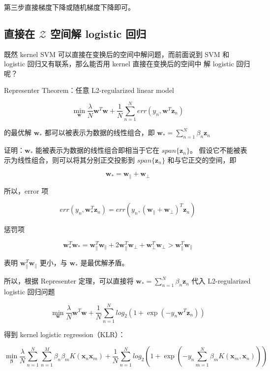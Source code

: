 \documentclass[a4paper]{article}
\begin{document}
第三步直接梯度下降或随机梯度下降即可。


\subsection{直接在 $\mathcal{Z}$ 空间解 logistic 回归}
既然 kernel SVM 可以直接在变换后的空间中解问题，而前面说到
SVM 和 logistic 回归又有联系，那么能否用 kernel 直接在变换后的空间中
解 logistic 回归呢？

Representer Theorem：任意 L2-regularized linear model

$$\operatorname*{min}_{\mathbf{w}} \frac{\lambda}{N}\mathbf{w}^T\mathbf{w} + \frac{1}{N}\sum_{n=1}^{N}err(y_n, \mathbf{w}^T\mathbf{z}_n)$$

的最优解 $\mathbf{w}_{*}$ 都可以被表示为数据的线性组合，即 $\displaystyle \mathbf{w}_{*} = \sum_{n=1}^{N}\beta_n\mathbf{z}_n$

证明：$\mathbf{w}_{*}$ 能被表示为数据的线性组合即相当于它在 $span\{\mathbf{z}_n\}$。
假设它不能被表示为线性组合，则可以将其分别正交投影到 $span\{\mathbf{z}_n\}$ 和与它正交的空间，即

$$\mathbf{w}_{*} = \mathbf{w}_{\parallel} + \mathbf{w}_{\perp}$$

所以，error 项

$$err(y_n, \mathbf{w}_{*}^T\mathbf{z}_n) = err(y_n, (\mathbf{w}_{\parallel} + \mathbf{w}_{\perp})^T\mathbf{z}_n)$$

惩罚项

$$\mathbf{w}_{*}^T\mathbf{w}_{*} = \mathbf{w}_{\parallel}^T\mathbf{w}_{\parallel} + 2\mathbf{w}_{\parallel}^T\mathbf{w}_{\perp} + \mathbf{w}_{\perp}^T\mathbf{w}_{\perp} > \mathbf{w}_{\parallel}^T\mathbf{w}_{\parallel}$$

表明 $\mathbf{w}_{\parallel}^T\mathbf{w}_{\parallel}$ 更小，与 $\mathbf{w}_{*}$ 是最优解矛盾。

所以，根据 Representer 定理，可以直接将 $\displaystyle \mathbf{w}_{*} = \sum_{n=1}^{N}\beta_n\mathbf{z}_n$ 代入 L2-regularized logistic 回归问题

$$\operatorname*{min}_{\mathbf{w}} \frac{\lambda}{N}\mathbf{w}^T\mathbf{w} + \frac{1}{N}\sum_{n=1}^{N}log_2(1 + \exp(-y_n\mathbf{w}^T\mathbf{z}_n))$$

得到 kernel logistic regression（KLR）：

$$\operatorname*{min}_{\bm{\beta}} \frac{\lambda}{N}\sum_{n=1}^{N} \sum_{n=1}^{M} \beta_n\beta_mK(\mathbf{x}_n\mathbf{x}_m) + \frac{1}{N}\sum_{n=1}^{N}log_2 \left ( 1 + \exp \left ( -y_n \sum_{m=1}^{N}\beta_mK(\mathbf{x}_m, \mathbf{x}_n) \right )  \right )$$
\end{document}
